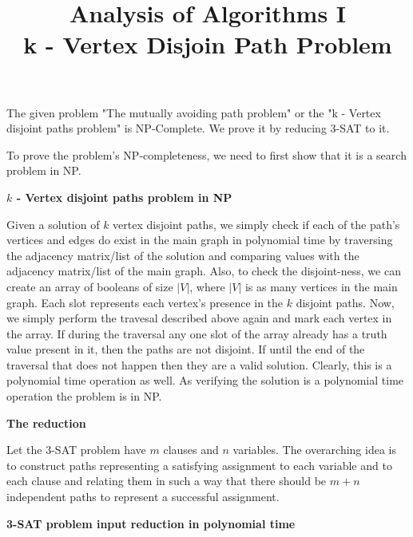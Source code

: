 \documentclass{imports}
\title{\textbf{Analysis of Algorithms I}\\ k - Vertex Disjoin Path Problem}
\author{}
\date{}
\begin{document}
\maketitle
\allowdisplaybreaks %

    The given problem "The mutually avoiding path problem" or the "k - Vertex disjoint paths problem" is NP-Complete.
    We prove it by reducing 3-SAT to it. \cite{kddmain} \cite{stackoverflowkdd} \vspace{10pt}
    
    To prove the problem's NP-completeness, we need to first show that it is a search problem in NP. \vspace{10pt}
    
    \textbf{$k$ - Vertex disjoint paths problem in NP}\vspace{10pt}

    Given a solution of $k$ vertex disjoint paths, we simply check if each of the path's vertices and edges do exist in the main graph
    in polynomial time by traversing the adjacency matrix/list of the solution and comparing values with the adjacency matrix/list of the main graph.
    Also, to check the disjoint-ness, we can create an array of booleans of size $|V|$, where $|V|$ is as many vertices in the main graph. Each slot represents each vertex's presence
    in the $k$ disjoint paths. Now, we simply perform the travesal described above again and mark each vertex in the array. If during the traversal
    any one slot of the array already has a truth value present in it, then the paths are not disjoint. If until the end of the traversal that does not
    happen then they are a valid solution. Clearly, this is a polynomial time operation as well. As verifying the solution is a polynomial time
    operation the problem is in NP. \vspace{10pt}

    \textbf{The reduction} \vspace{10pt}

    Let the 3-SAT problem have $m$ clauses and $n$ variables. The overarching idea is to construct paths representing
    a satisfying assignment to each variable and to each clause and relating them in such a way that there should be $m+n$
    independent paths to represent a successful assignment. \vspace{10pt}

    \textbf{3-SAT problem input reduction in polynomial time}\vspace{10pt}
    
\end{document}

